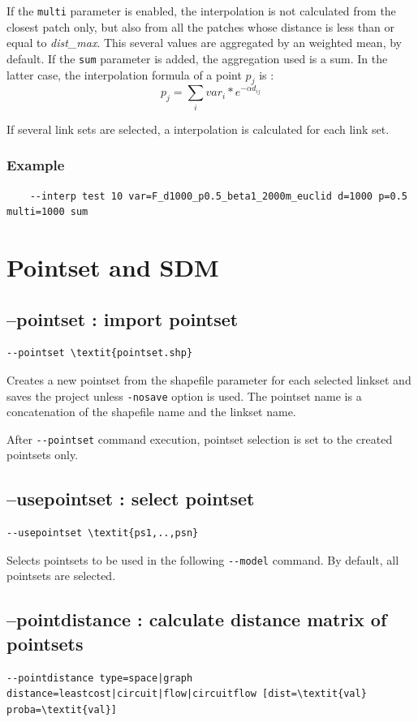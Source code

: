 \documentclass[a4paper,10pt]{report}
\begin{document}
If the \verb|multi| parameter is enabled, the interpolation is not calculated from the closest patch only, but also from all the patches whose distance is less than or equal to \textit{dist\_max}. This several values are aggregated by an weighted mean, by default. If the \verb|sum| parameter is added, the aggregation used is a sum. In the latter case, the interpolation formula of a point $p_j$ is :
$$p_j = \sum_i{var_i * e^{-\alpha d_{ij}}} $$

If several link sets are selected, a interpolation is calculated for each link set.

\subsubsection{Example}
\begin{Verbatim}
	--interp test 10 var=F_d1000_p0.5_beta1_2000m_euclid d=1000 p=0.5 multi=1000 sum
\end{Verbatim}


\section{Pointset and SDM}
\subsection{--pointset : import pointset}
\begin{Verbatim}[commandchars=\\\{\}]
--pointset \textit{pointset.shp}
\end{Verbatim}
Creates a new pointset from the shapefile parameter for each selected linkset and saves the project unless \verb|-nosave| option is used.
The pointset name is a concatenation of the shapefile name and the linkset name.

After \verb|--pointset| command execution, pointset selection is set to the created pointsets only.

\subsection{--usepointset : select pointset}
\begin{Verbatim}[commandchars=\\\{\}]
--usepointset \textit{ps1,..,psn}
\end{Verbatim}
Selects pointsets to be used in the following \verb|--model| command.
By default, all pointsets are selected.

\subsection{--pointdistance : calculate distance matrix of pointsets}
\begin{Verbatim}[commandchars=\\\{\}]
--pointdistance type=space|graph distance=leastcost|circuit|flow|circuitflow [dist=\textit{val} proba=\textit{val}]
\end{Verbatim}
\end{document}
